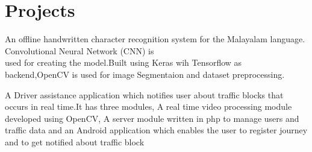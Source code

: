 \documentclass[11pt]{hieudo-build}
\begin{document}
\begin{minipage}[t]{0.65\textwidth}
\section{Projects}
\descript{}
An offline handwritten character recognition system for the Malayalam language. Convolutional Neural Network (CNN) is\\ used for creating the model.Built using Keras wih Tensorflow as backend,OpenCV is used for image Segmentaion and dataset preprocessing.    
\sectionsep

\descript{}
A Driver assistance  application which notifies user about traffic blocks that occurs  in  real time.It has three modules,  A real time video processing module developed using OpenCV, A server module written in php to manage users and traffic data and an Android application which enables the user to register journey\\ and to get notified about traffic block 

\sectionsep 

\sectionsep

\end{minipage} 
\end{document}
